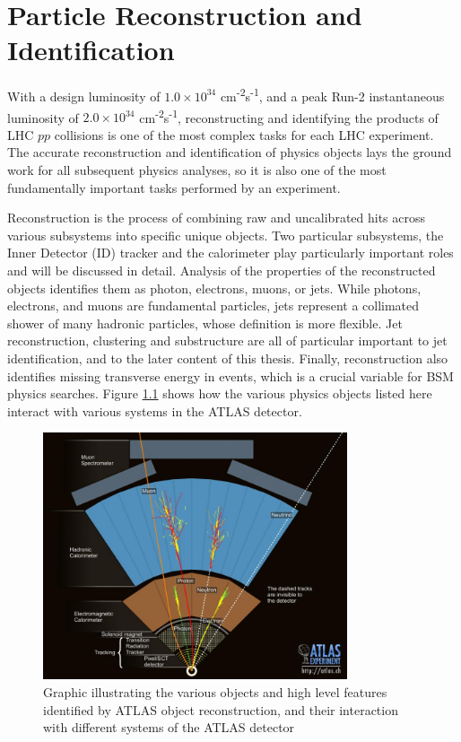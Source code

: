 \chapter{Particle Reconstruction and Identification}
\label{ch:part_reco}

With a design luminosity of $1.0 \times 10^{34}$ cm\textsuperscript{-2}s\textsuperscript{-1}, and a peak Run-2 instantaneous luminosity of $2.0 \times 10^{34}$ cm\textsuperscript{-2}s\textsuperscript{-1}, reconstructing and identifying the products of LHC $pp$ collisions is one of the most complex tasks for each LHC experiment. The accurate reconstruction and identification of physics objects lays the ground work for all subsequent physics analyses, so it is also one of the most fundamentally important tasks performed by an experiment. \par

Reconstruction is the process of combining raw and uncalibrated hits across various subsystems into specific unique objects. Two particular subsystems, the Inner Detector (ID) tracker and the calorimeter play particularly important roles and will be discussed in detail. Analysis of the properties of the reconstructed objects identifies them as photon, electrons, muons, or jets. While photons, electrons, and muons are fundamental particles, jets represent a collimated shower of many hadronic particles, whose definition is more flexible. Jet reconstruction, clustering and substructure are all of particular important to jet identification, and to the later content of this thesis. Finally, reconstruction also identifies missing transverse energy \met in events, which is a crucial variable for BSM physics searches. Figure \ref{fig:detector_objects} shows how the various physics objects listed here interact with various systems in the ATLAS detector. 

\begin{figure}
        \centering
	\includegraphics[width=0.8\textwidth]{figures/ch5/detector_objects}
	\caption{Graphic illustrating the various objects and high level features identified by ATLAS object reconstruction, and their interaction with different systems of the ATLAS detector \cite{detector_events}}
	\label{fig:detector_objects}
\end{figure}

